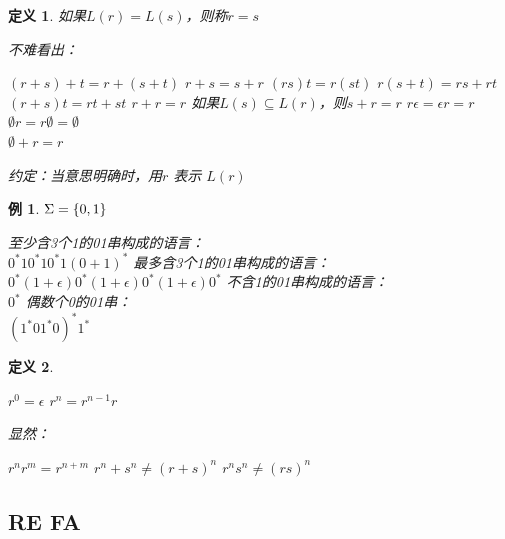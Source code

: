 \documentclass{ctexart}
\newtheorem{definition}{定义}[section]
\newtheorem{example}{例}[section]
\DeclarePairedDelimiter{\set}{\{}{\}}
\begin{document}
\begin{definition}
    如果$L(r) = L(s)$，则称$r = s$

    不难看出：
    \begin{outline}
        \1 $(r+s) + t = r+(s+t)$
        \1 $r+s = s+r$
        \1 $(rs)t = r(st)$
        \1 $r(s+t) = rs + rt$
        \1 $(r+s)t = rt + st$
        \1 $r+r = r$
        \1 如果$L(s) \subseteq L(r)$，则$s+r = r$
        \1 $r\epsilon = \epsilon r = r$
        \1 $\emptyset r = r \emptyset = \emptyset$ \\
            $\emptyset + r = r$
    \end{outline}

    约定：当意思明确时，用$r$ 表示 $L(r)$
\end{definition}

\begin{example}
    $\Sigma = \set{0,1}$
    \begin{outline}[enumerate]
        \1 至少含3个1的01串构成的语言：\\ 
            $0^*10^*10^*1(0+1)^*$
        \1 最多含3个1的01串构成的语言：\\ 
            $0^*(1+\epsilon)0^*(1+\epsilon)0^*(1+\epsilon)0^*$
        \1 不含1的01串构成的语言：\\ 
            $0^*$
        \1 偶数个0的01串： \\
            $(1^*01^*0)^*1^*$
    \end{outline}
\end{example}

\begin{definition}
    \begin{outline}
        \1 $r^0 = \epsilon$
        \1 $r^n = r^{n-1}r$
    \end{outline}

    显然：
    \begin{outline}
        \1 $r^nr^m = r^{n+m}$
        \1 $r^n + s^n \ne (r+s)^n$
        \1 $r^ns^n \ne (rs)^n$
    \end{outline}
\end{definition}

\subsection{RE \textrightarrow FA}
\end{document}
